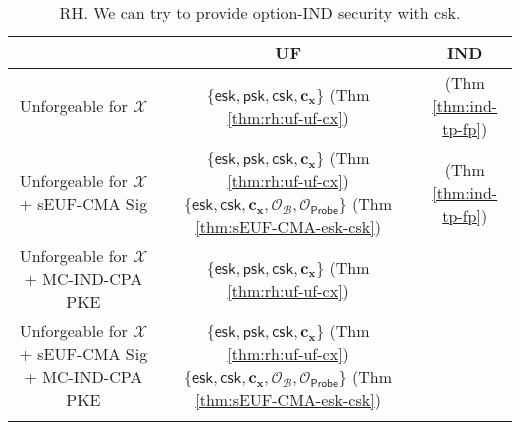 


\begin{table}[ht]
\centering
\begin{tabular}{c c c} 
	
	\toprule

	& \textbf{UF} & \textbf{IND} \\
	
	\midrule

	Unforgeable for $\mathcal{X}$ & $\{ \textsf{esk}, \textsf{psk}, \textsf{csk}, \mathbf{c_x} \}$ (Thm \ref{thm:rh:uf-uf-cx}) & \xmark \; (Thm \ref{thm:ind-tp-fp}) \\
	
	\midrule
	
	\makecell{Unforgeable for $\mathcal{X}$ \\ + sEUF-CMA \textsf{Sig}} & \makecell{ $\{ \textsf{esk}, \textsf{psk}, \textsf{csk}, \mathbf{c_x} \}$ (Thm \ref{thm:rh:uf-uf-cx}) \\ $\{ \textsf{esk}, \textsf{csk}, \mathbf{c_x}, \mathcal{O}_\mathcal{B}, \mathcal{O}_{\textsf{Probe}} \}$ (Thm \ref{thm:sEUF-CMA-esk-csk}) } & \xmark \; (Thm \ref{thm:ind-tp-fp}) \\
	
	\midrule
	
	\makecell{ Unforgeable for $\mathcal{X}$ \\+ MC-IND-CPA \textsf{PKE}} & $\{ \textsf{esk}, \textsf{psk}, \textsf{csk}, \mathbf{c_x} \}$ (Thm \ref{thm:rh:uf-uf-cx}) & \makecell{$\{ \textsf{esk}, \textsf{psk}, \mathbf{c_x}, \mathcal{O}_{\mathbf{c_y}} \}$ (Thm \ref{thm:mc-ind-cpa:ind-esk-psk})} \\
	
	\midrule
	
	\makecell{Unforgeable for $\mathcal{X}$ \\ + sEUF-CMA \textsf{Sig} \\ + MC-IND-CPA \textsf{PKE}} & \makecell{ $\{ \textsf{esk}, \textsf{psk}, \textsf{csk}, \mathbf{c_x} \}$ (Thm \ref{thm:rh:uf-uf-cx}) \\ $\{ \textsf{esk}, \textsf{csk}, \mathbf{c_x}, \mathcal{O}_\mathcal{B}, \mathcal{O}_{\textsf{Probe}} \}$ (Thm \ref{thm:sEUF-CMA-esk-csk}) }  & \makecell{$\{ \textsf{esk}, \textsf{psk}, \mathbf{c_x}, \mathcal{O}_{\mathbf{c_y}} \}$ (Thm \ref{thm:mc-ind-cpa:ind-esk-psk})} \\
	
	\bottomrule

\medskip
\end{tabular}
\caption{RH. We can try to provide \textsf{option}-IND security with \textsf{csk}.}
\label{table:rh}
\end{table}

